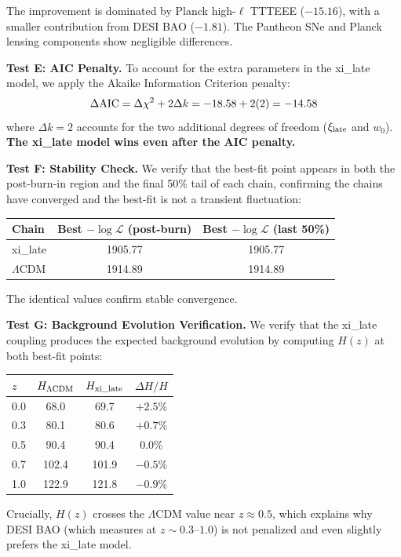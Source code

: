 \documentclass[twocolumn,showpacs,preprintnumbers,amsmath,amssymb,prd]{revtex4-2}
\begin{document}
The improvement is dominated by Planck high-$\ell$ TTTEEE ($-15.16$), with a smaller contribution from DESI BAO ($-1.81$). The Pantheon SNe and Planck lensing components show negligible differences.

\textbf{Test E: AIC Penalty.}
To account for the extra parameters in the xi\_late model, we apply the Akaike Information Criterion penalty:
\begin{equation}
\Delta{\rm AIC} = \Delta\chi^2 + 2\Delta k = -18.58 + 2(2) = -14.58
\end{equation}
where $\Delta k = 2$ accounts for the two additional degrees of freedom ($\xi_{\rm late}$ and $w_0$). \textbf{The xi\_late model wins even after the AIC penalty.}

\textbf{Test F: Stability Check.}
We verify that the best-fit point appears in both the post-burn-in region and the final 50\% tail of each chain, confirming the chains have converged and the best-fit is not a transient fluctuation:
\begin{center}
\begin{tabular}{lcc}
\toprule
Chain & Best $-\log\mathcal{L}$ (post-burn) & Best $-\log\mathcal{L}$ (last 50\%) \\
\midrule
xi\_late & 1905.77 & 1905.77 \\
$\Lambda$CDM & 1914.89 & 1914.89 \\
\bottomrule
\end{tabular}
\end{center}
The identical values confirm stable convergence.

\textbf{Test G: Background Evolution Verification.}
We verify that the xi\_late coupling produces the expected background evolution by computing $H(z)$ at both best-fit points:
\begin{center}
\begin{tabular}{lccc}
\toprule
$z$ & $H_{\Lambda{\rm CDM}}$ & $H_{\rm xi\_late}$ & $\Delta H/H$ \\
\midrule
0.0 & 68.0 & 69.7 & $+2.5\%$ \\
0.3 & 80.1 & 80.6 & $+0.7\%$ \\
0.5 & 90.4 & 90.4 & $0.0\%$ \\
0.7 & 102.4 & 101.9 & $-0.5\%$ \\
1.0 & 122.9 & 121.8 & $-0.9\%$ \\
\bottomrule
\end{tabular}
\end{center}

Crucially, $H(z)$ crosses the $\Lambda$CDM value near $z \approx 0.5$, which explains why DESI BAO (which measures at $z \sim 0.3$--$1.0$) is not penalized and even slightly prefers the xi\_late model.
\end{document}
